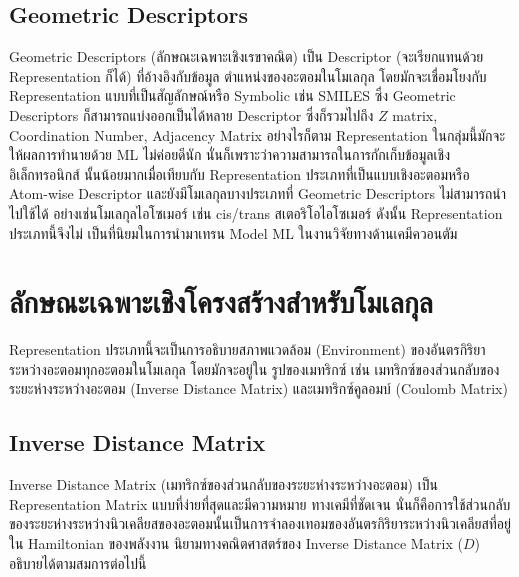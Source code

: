\subsection{Geometric Descriptors}

Geometric Descriptors (ลักษณะเฉพาะเชิงเรขาคณิต) เป็น Descriptor (จะเรียกแทนด้วย Representation ก็ได้) ที่อ้างอิงกับข้อมูล%
ตำแหน่งของอะตอมในโมเลกุล โดยมักจะเชื่อมโยงกับ Representation แบบที่เป็นสัญลักษณ์หรือ Symbolic เช่น SMILES ซึ่ง Geometric 
Descriptors ก็สามารถแบ่งออกเป็นได้หลาย Descriptor ซึ่งก็รวมไปถึง $Z$ matrix, Coordination Number, Adjacency Matrix 
อย่างไรก็ตาม Representation ในกลุ่มนี้มักจะให้ผลการทำนายด้วย ML ไม่ค่อยดีนัก นั่นก็เพราะว่าความสามารถในการกักเก็บข้อมูลเชิงอิเล็กทรอนิกส์%
นั้นน้อยมากเมื่อเทียบกับ Representation ประเภทที่เป็นแบบเชิงอะตอมหรือ Atom-wise Descriptor และยังมีโมเลกุลบางประเภทที่ Geometric 
Descriptors ไม่สามารถนำไปใช้ได้ อย่างเช่นโมเลกุลไอโซเมอร์ เช่น cis/trans สเตอริโอไอโซเมอร์ ดังนั้น Representation ประเภทนี้จึงไม่%
เป็นที่นิยมในการนำมาเทรน Model ML ในงานวิจัยทางด้านเคมีควอนตัม\cite{keith2021,musil2021}

\section{ลักษณะเฉพาะเชิงโครงสร้างสำหรับโมเลกุล}

Representation ประเภทนี้จะเป็นการอธิบายสภาพแวดล้อม (Environment) ของอันตรกิริยาระหว่างอะตอมทุกอะตอมในโมเลกุล โดยมักจะอยู่ใน%
รูปของเมทริกซ์ เช่น เมทริกซ์ของส่วนกลับของระยะห่างระหว่างอะตอม (Inverse Distance Matrix) และเมทริกซ์คูลอมบ์ (Coulomb Matrix)

\subsection{Inverse Distance Matrix}

Inverse Distance Matrix (เมทริกซ์ของส่วนกลับของระยะห่างระหว่างอะตอม) เป็น Representation Matrix แบบที่ง่ายที่สุดและมีความหมาย%
ทางเคมีที่ชัดเจน นั่นก็คือการใช้ส่วนกลับของระยะห่างระหว่างนิวเคลียสของอะตอมนั้นเป็นการจำลองเทอมของอันตรกิริยาระหว่างนิวเคลียสที่อยู่ใน 
Hamiltonian ของพลังงาน นิยามทางคณิตศาสตร์ของ Inverse Distance Matrix ($D$) อธิบายได้ตามสมการต่อไปนี้

